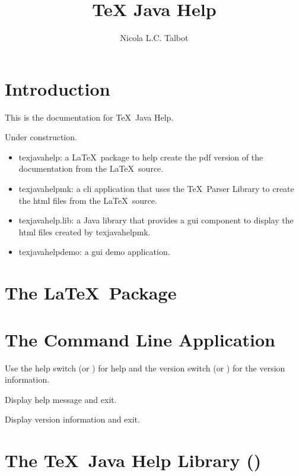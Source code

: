 \documentclass[toc=listof]{scrreport}
\title{\texorpdfstring{\TeX}{TeX} Java Help}
\author{Nicola L.C. Talbot}
\begin{document}
\maketitle
\tableofcontents

\chapter{Introduction}
\label{sec:intro}

This is the documentation for \TeX\ Java Help.

\begin{warning}
Under construction.
\end{warning}

\begin{itemize}
\item \gls{texjavahelp}: a \LaTeX\ package to help create the \gls{pdf} version of
the documentation from the \LaTeX\ source.

\item \gls{texjavahelpmk}: a \gls{cli} application that uses the \TeX\ Parser
Library to create the \gls{html} files from the \LaTeX\ source.

\item \gls{texjavahelp.lib}: a Java library that provides a \gls{gui} 
component to display the \gls{html} files created by \gls{texjavahelpmk}.

\item \gls{texjavahelpdemo}: a \gls{gui} demo application.
\end{itemize}

\chapter{The  \LaTeX\ Package}
\label{sec:texjavahelpsty}


\chapter{The  Command Line Application}
\label{sec:texjavahelpmk}


Use the \gls{help} switch (or ) for help and the
\gls{version} switch (or ) for the version information.

Display help message and exit.

Display version information and exit.

\chapter{The \TeX\ Java Help Library ()}


\printterms

\printindex
\end{document}
